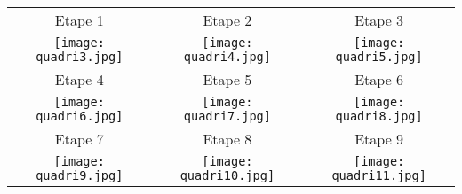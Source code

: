 \begin{figure*}[!h]
\begin{tabular}{ccc}
Etape 1 & Etape 2 & Etape 3 \\
\texttt{[image: quadri3.jpg]} & \texttt{[image: quadri4.jpg]} & \texttt{[image: quadri5.jpg]} \\ 

Etape 4 & Etape 5 & Etape 6 \\
\texttt{[image: quadri6.jpg]} & \texttt{[image: quadri7.jpg]} & \texttt{[image: quadri8.jpg]} \\ 

Etape 7 & Etape 8 & Etape 9 \\
\texttt{[image: quadri9.jpg]} & \texttt{[image: quadri10.jpg]} & \texttt{[image: quadri11.jpg]} \\ 

\end{tabular}
\end{figure*}





%
%
%
%
%
%
%

